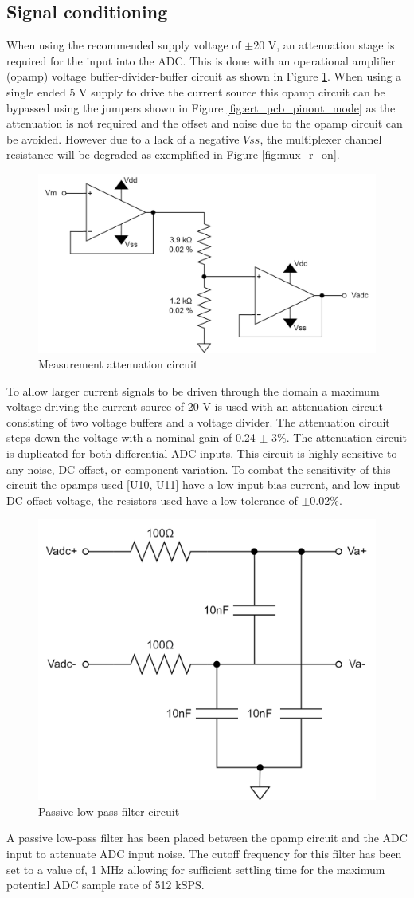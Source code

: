 \subsection{Signal conditioning}
When using the recommended supply voltage of $\pm$20 V, an attenuation stage is required for the input into the ADC. This is done with an operational amplifier (opamp) voltage buffer-divider-buffer circuit as shown in Figure \ref{fig:opamp_ckt}. When using a single ended 5 V supply to drive the current source this opamp circuit can be bypassed using the jumpers shown in Figure \ref{fig:ert_pcb_pinout_mode} as the attenuation is not required and the offset and noise due to the opamp circuit can be avoided. However due to a lack of a negative $Vss$, the multiplexer channel resistance will be degraded as exemplified in Figure \ref{fig:mux_r_on}.
\begin{figure}[H]
\centering
\includegraphics[width=0.5\linewidth]{Figures/opamp_ckt_ert_pcb.png}
\caption{Measurement attenuation circuit}
\label{fig:opamp_ckt}
\end{figure}
To allow larger current signals to be driven through the domain a maximum voltage driving the current source of 20 V is used with an attenuation circuit consisting of two voltage buffers and a voltage divider. The attenuation circuit steps down the voltage with a nominal gain of 0.24 $\pm$ 3\%. The attenuation circuit is duplicated for both differential ADC inputs. This circuit is highly sensitive to any noise, DC offset, or component variation. To combat the sensitivity of this circuit the opamps used [U10, U11] have a low input bias current, and low input DC offset voltage, the resistors used have a low tolerance of $\pm$0.02\%.
\begin{figure}[H]
\centering
\includegraphics[width=0.4\linewidth]{Figures/adc_filter_ckt.png}
\caption{Passive low-pass filter circuit}
\label{fig:adc_filter_ckt}
\end{figure}
A passive low-pass filter has been placed between the opamp circuit and the ADC input to attenuate ADC input noise. The cutoff frequency for this filter has been set to a value of, 1 MHz allowing for sufficient settling time for the maximum potential ADC sample rate of 512 kSPS.


